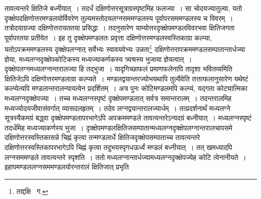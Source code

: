 \documentclass[11pt, openany]{book}
\begin{document}
\noindent तावत्यन्तरे क्षितिजे बध्नीयात्~। तदर्धं दक्षिणोत्तरसूत्राग्रस्पृष्टमिह फलज्या~। सा चोदयज्यातुल्या, यतो दृक्क्षेपदक्षिणोत्तरमण्डलयोर्विवरेण तुल्यमस्तोदयलग्नसममण्डलस्य पूर्वापरसममण्डलस्य च विवरम्~। तत्रोदयाग्रज्या दक्षिणोत्तरायततया प्रसिद्धा~। तदनुसारेण याम्योत्तरदृक्क्षेपमण्डलविवरभवा क्षितिजगता पूर्वापरतया प्रतीयेत~। इह तु दृक्क्षेपमण्डलतः प्रवृत्ता दक्षिणोत्तरमण्डलस्वस्तिकाग्रा कल्प्या, यतोऽपक्रममण्डलस्य दृक्क्षेपलग्नात् सर्वेभ्यः स्वावयवेभ्यः उन्नता\renewcommand{\thefootnote}{१}\footnote{ताद्दक्षि \textendash\ ग.}
दक्षिणोत्तरापक्रममण्डलसम्पातान्तार्धज्या ज्ञेया, मध्यलग्नदृक्क्षेपकोटिकस्य मध्यज्याकर्णकस्य त्र्यश्रस्य भुजाया ज्ञेयत्वात्~।
दृक्क्षेपलग्नमध्यलग्नान्तरालज्या हि तद्भुजा~। यादृगिच्छाफलं प्रमाणफलेनापि तादृशा भवितव्यमिति क्षितिजेऽपि दक्षिणोत्तरमण्डलाग्रा कल्प्यते~। मण्डलद्वयान्तरज्योभयथापि तुल्यैवेति तत्तत्फलानुसारेण यथेष्टं कल्प्येत्यपि मण्डलान्तरालन्यायत्वेन प्रदर्शितम्~। अत्र पुनः कोटिमण्डलमपि कल्प्यं, यद्गता कोट्यात्मिका मध्यलग्नदृक्क्षेपज्या~। तच्च मध्यलग्नस्पृष्टं दृक्क्षेपमण्डलात् सर्वत्र समान्तरालम्~। तदन्तरालमिह मध्यज्योदयजीवासंवर्गात् व्यासदलहृतम्~। तदेव लग्नद्वयान्तरालज्यार्धम्~। तत्प्रदर्शनार्थं मध्यलग्ने सूत्रस्यैकमग्रं बद्ध्वा दृक्क्षेपमण्डलापरभागेऽपि अपक्रममण्डले तावत्यन्तरेऽन्यदग्रं बध्नीयात्~। मध्यलग्नस्पृष्टं तदर्धमिह मध्यज्याकर्णस्य भुजा~।
दृक्क्षेपमण्डलक्षितिजसम्पातान्मध्यलग्नदृक्क्षेपलग्नान्तरालचापसमे दक्षिणोत्तरस्वस्तिकासन्ने चिह्नं कृत्वा तन्मण्डलार्धे क्षितिजदृक्क्षेपसम्पाताच्च तावत्यन्तरे दक्षिणोत्तरस्वस्तिकापरभागेऽपि चिह्नं कृत्वा तदुभयस्पृगधऊर्ध्वं मण्डलं बध्नीयात्~। तत् खमध्यादपि लग्नसममण्डले तावत्यन्तरे स्पृशति~। ततो मध्यलग्नान्तार्धज्यामध्यलग्नदृक्क्षेपज्येह कोटि त्वेनानीयते~। इहापमण्डललग्नसममण्डलयोरन्तरालं क्षितिजात् प्रभृति

\newpage
\end{document}
